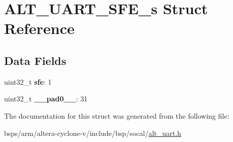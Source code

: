 \hypertarget{structALT__UART__SFE__s}{}\section{A\+L\+T\+\_\+\+U\+A\+R\+T\+\_\+\+S\+F\+E\+\_\+s Struct Reference}
\label{structALT__UART__SFE__s}
\subsection*{Data Fields}
\begin{DoxyCompactItemize}
\item 
\mbox{\label{structALT__UART__SFE__s_aa00a34c0e757c5a30adff76067b2c015}} 
uint32\+\_\+t {\bfseries sfe}\+: 1
\item 
\mbox{\label{structALT__UART__SFE__s_aab900a266d36d1af98c9c073f48ca89a}} 
uint32\+\_\+t {\bfseries \+\_\+\+\_\+pad0\+\_\+\+\_\+}\+: 31
\end{DoxyCompactItemize}


The documentation for this struct was generated from the following file\+:\begin{DoxyCompactItemize}
\item 
bsps/arm/altera-\/cyclone-\/v/include/bsp/socal/\mbox{\hyperlink{alt__uart_8h}{alt\+\_\+uart.\+h}}\end{DoxyCompactItemize}
